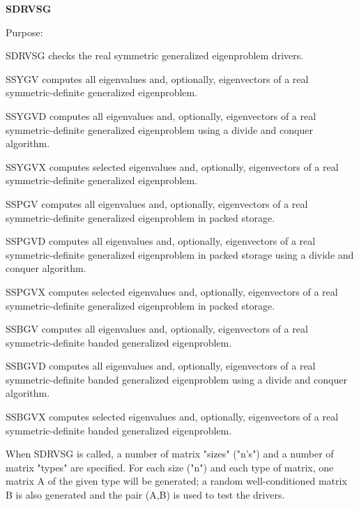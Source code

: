 {\bfseries S\+D\+R\+V\+S\+G} 

\begin{DoxyParagraph}{Purpose\+: }
\begin{DoxyVerb}      SDRVSG checks the real symmetric generalized eigenproblem
      drivers.

              SSYGV computes all eigenvalues and, optionally,
              eigenvectors of a real symmetric-definite generalized
              eigenproblem.

              SSYGVD computes all eigenvalues and, optionally,
              eigenvectors of a real symmetric-definite generalized
              eigenproblem using a divide and conquer algorithm.

              SSYGVX computes selected eigenvalues and, optionally,
              eigenvectors of a real symmetric-definite generalized
              eigenproblem.

              SSPGV computes all eigenvalues and, optionally,
              eigenvectors of a real symmetric-definite generalized
              eigenproblem in packed storage.

              SSPGVD computes all eigenvalues and, optionally,
              eigenvectors of a real symmetric-definite generalized
              eigenproblem in packed storage using a divide and
              conquer algorithm.

              SSPGVX computes selected eigenvalues and, optionally,
              eigenvectors of a real symmetric-definite generalized
              eigenproblem in packed storage.

              SSBGV computes all eigenvalues and, optionally,
              eigenvectors of a real symmetric-definite banded
              generalized eigenproblem.

              SSBGVD computes all eigenvalues and, optionally,
              eigenvectors of a real symmetric-definite banded
              generalized eigenproblem using a divide and conquer
              algorithm.

              SSBGVX computes selected eigenvalues and, optionally,
              eigenvectors of a real symmetric-definite banded
              generalized eigenproblem.

      When SDRVSG is called, a number of matrix "sizes" ("n's") and a
      number of matrix "types" are specified.  For each size ("n")
      and each type of matrix, one matrix A of the given type will be
      generated; a random well-conditioned matrix B is also generated
      and the pair (A,B) is used to test the drivers.


\end{DoxyVerb}
\end{DoxyParagraph}
